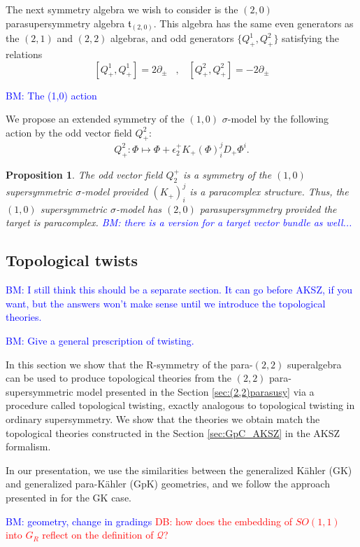 \documentclass{article}
\newcommand{\QQ}{\mathcal{Q}}
\newtheorem{proposition}[theorem]{Proposition}
\theoremstyle{definition}
\theoremstyle{remark}
\def\brian{\textcolor{blue}{BM: }\textcolor{blue}}
\def\david{\textcolor{red}{DB: }\textcolor{red}}
\begin{document}
The next symmetry algebra we wish to consider is the $(2,0)$ parasupersymmetry algebra $\mathfrak{t}_{(2,0)}$. 
This algebra has the same even generators as the $(2,1)$ and $(2,2)$ algebras, and odd generators $\{Q^1_+, Q^2_+\}$ satisfying the relations
\[
[Q^1_+, Q^1_+] =  2 \partial_\pm \;\;\; , \;\;\; [Q^2_+, Q^2_+] = - 2 \partial_\pm
\]

\brian{The (1,0) action}

We propose an extended symmetry of the $(1,0)$ $\sigma$-model by the following action by the odd vector field $Q_+^2$:
\[
Q^2_+ : \Phi \mapsto \Phi + \epsilon_2^+ K_+(\Phi)^j_i D_+ \Phi^i .
\]

\begin{proposition}
The odd vector field $Q_2^+$ is a symmetry of the $(1,0)$ supersymmetric $\sigma$-model provided $(K_+)^{j}_i$ is a paracomplex structure. 
Thus, the $(1,0)$ supersymmetric $\sigma$-model has $(2,0)$ parasupersymmetry provided the target is paracomplex. \brian{there is a version for a target vector bundle as well...}
\end{proposition}

\subsection{Topological twists}\label{sec:toptwist}

\brian{I still think this should be a separate section. It can go before AKSZ, if you want, but the answers won't make sense until we introduce the topological theories.}

\brian{Give a general prescription of twisting.}

In this section we show that the R-symmetry of the para-$(2,2)$ superalgebra can be used to produce topological theories from the $(2,2)$ para-supersymmetric model presented in the Section \ref{sec:(2,2)parasusy} via a procedure called topological twisting, exactly analogous to topological twisting in ordinary supersymmetry. We show that the theories we obtain match the topological theories constructed in the Section \ref{sec:GpC_AKSZ} in the AKSZ formalism. 

In our presentation, we use the similarities between the generalized K\"{a}hler (GK) and generalized para-K\"{a}hler (GpK) geometries, and we follow the approach presented in \cite{Kapustin:2004gv} for the GK case.

\brian{geometry, change in gradings}
\david{how does the embedding of $SO(1,1)$ into $G_R$ reflect on the definition of $\QQ$?}
\end{document}
